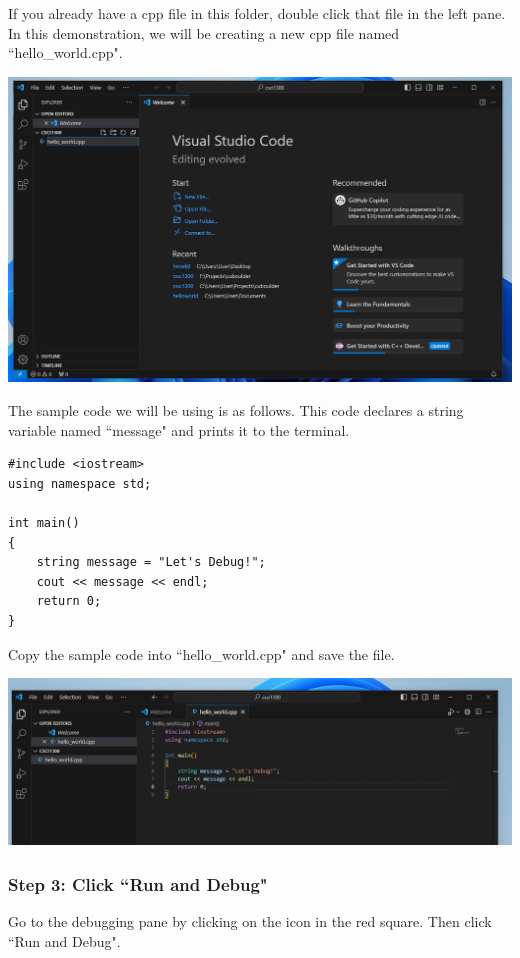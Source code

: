 If you already have a cpp file in this folder, double click that file in the left pane. In this demonstration, we will be creating a new cpp file named ``hello\_world.cpp". 

\includegraphics[width=\textwidth]{images/windowsDebuggerSetup/debugger_windows_2.png}

The sample code we will be using is as follows. This code declares a string variable named ``message" and prints it to the terminal.

\begin{verbatim}
#include <iostream>
using namespace std;

int main()
{
    string message = "Let's Debug!";
    cout << message << endl;
    return 0;
}
\end{verbatim}

Copy the sample code into ``hello\_world.cpp" and save the file. 

\includegraphics[width=\textwidth]{images/windowsDebuggerSetup/debugger_windows_3.png}

\subsubsection{Step 3: Click ``Run and Debug"}

Go to the debugging pane by clicking on the icon in the red square. Then click ``Run and Debug". 

